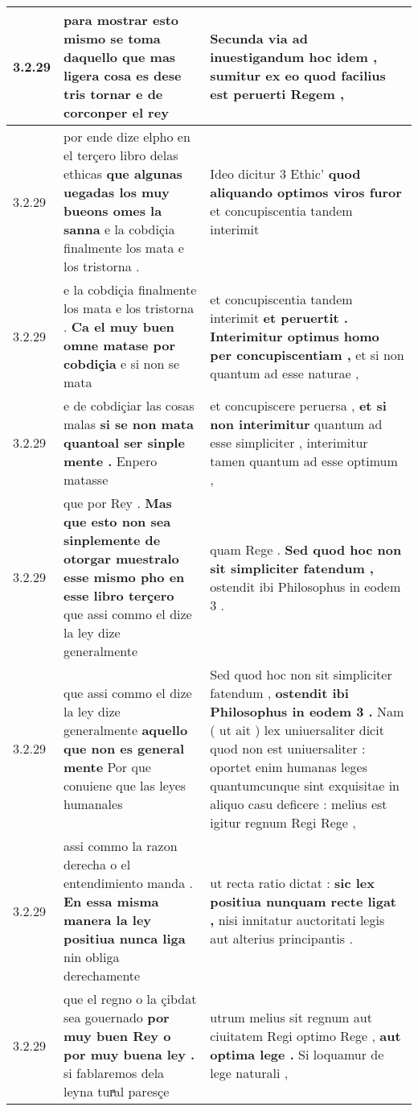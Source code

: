 \begin{tabular}{|p{1cm}|p{6.5cm}|p{6.5cm}|}
3.2.29 & para mostrar esto mismo se toma daquello \textbf{ que mas ligera cosa es dese tris tornar } e de corconper el rey & Secunda via ad inuestigandum hoc idem , \textbf{ sumitur } ex eo quod facilius est peruerti Regem , \\\hline
3.2.29 & por ende dize elpho en el terçero libro delas ethicas \textbf{ que algunas uegadas los muy bueons omes la sanna } e la cobdiçia finalmente los mata e los tristorna . & Ideo dicitur 3 Ethic’ \textbf{ quod aliquando optimos viros furor } et concupiscentia tandem interimit \\\hline
3.2.29 & e la cobdiçia finalmente los mata e los tristorna . \textbf{ Ca el muy buen omne matase por cobdiçia } e si non se mata & et concupiscentia tandem interimit \textbf{ et peruertit . Interimitur optimus homo per concupiscentiam , } et si non quantum ad esse naturae , \\\hline
3.2.29 & e de cobdiçiar las cosas malas \textbf{ si se non mata quantoal ser sinple mente . } Enpero matasse & et concupiscere peruersa , \textbf{ et si non interimitur } quantum ad esse simpliciter , interimitur tamen quantum ad esse optimum , \\\hline
3.2.29 & que por Rey . \textbf{ Mas que esto non sea sinplemente de otorgar muestralo esse mismo pho en esse libro terçero } que assi commo el dize la ley dize generalmente & quam Rege . \textbf{ Sed quod hoc non sit simpliciter fatendum , } ostendit ibi Philosophus in eodem 3 . \\\hline
3.2.29 & que assi commo el dize la ley dize generalmente \textbf{ aquello que non es general mente } Por que conuiene que las leyes humanales & Sed quod hoc non sit simpliciter fatendum , \textbf{ ostendit ibi Philosophus in eodem 3 . } Nam ( ut ait ) lex uniuersaliter dicit quod non est uniuersaliter : oportet enim humanas leges quantumcunque sint exquisitae in aliquo casu deficere : melius est igitur regnum Regi Rege , \\\hline
3.2.29 & assi commo la razon derecha o el entendimiento manda . \textbf{ En essa misma manera la ley positiua nunca liga } nin obliga derechamente & ut recta ratio dictat : \textbf{ sic lex positiua nunquam recte ligat , } nisi innitatur auctoritati legis aut alterius principantis . \\\hline
3.2.29 & que el regno o la çibdat sea gouernado \textbf{ por muy buen Rey o por muy buena ley . } si fablaremos dela leyna turͣal paresçe & utrum melius sit regnum aut ciuitatem Regi optimo Rege , \textbf{ aut optima lege . } Si loquamur de lege naturali , \\\hline

\end{tabular}
